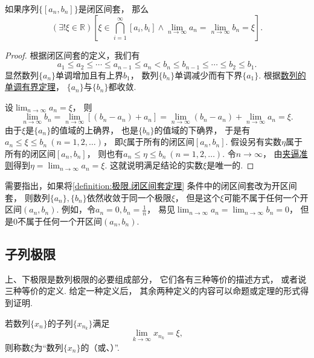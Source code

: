 \begin{theorem}[闭区间套定理]\label{definition:极限.闭区间套定理}
如果序列\(\{[a_n,b_n]\}\)是闭区间套，
那么\[
	(\exists!\xi\in\mathbb{R})
	\left[
		\xi \in \bigcap_{i=1}^\infty [a_i,b_i]
		\land
		\lim_{n\to\infty} a_n = \lim_{n\to\infty} b_n = \xi
	\right].
\]
\begin{proof}
根据闭区间套的定义，我们有\[
	a_1 \leq a_2 \leq \dotsb \leq a_{n-1} \leq a_n
	< b_n \leq b_{n-1} \leq \dotsb \leq b_2 \leq b_1.
\]
显然数列\(\{a_n\}\)单调增加且有上界\(b_1\)，
数列\(\{b_n\}\)单调减少而有下界\(\{a_1\}\).
根据\hyperref[theorem:极限.数列的单调有界定理]{数列的单调有界定理}，
\(\{a_n\}\)与\(\{b_n\}\)都收敛.

设\(\lim_{n\to\infty} a_n = \xi\)，
则\[
	\lim_{n\to\infty} b_n
	= \lim_{n\to\infty} [(b_n - a_n) + a_n]
	= \lim_{n\to\infty} (b_n - a_n) + \lim_{n\to\infty} a_n
	= \xi.
\]
由于\(\xi\)是\(\{a_n\}\)的值域的上确界，
也是\(\{b_n\}\)的值域的下确界，
于是有\(a_n \leq \xi \leq b_n\ (n=1,2,\dotsc)\)，
即\(\xi\)属于所有的闭区间\([a_n,b_n]\).
假设另有实数\(\eta\)属于所有的闭区间\([a_n,b_n]\)，
则也有\(a_n \leq \eta \leq b_n\ (n=1,2,\dotsc)\).
令\(n\to\infty\)，
由\hyperref[theorem:数列极限.夹逼准则]{夹逼准则}得到\(\eta=\lim_{n\to\infty} a_n=\xi\).
这就说明满足结论的实数\(\xi\)是唯一的.
\end{proof}
\end{theorem}

需要指出，如果将\cref{definition:极限.闭区间套定理} 条件中的闭区间套改为开区间套，
则数列\(\{a_n\},\{b_n\}\)依然收敛于同一个极限\(\xi\)，
但是这个\(\xi\)可能不属于任何一个开区间\((a_n,b_n)\).
例如，令\(a_n = 0, b_n = \frac1n\)，
易见\(\lim_{n\to\infty} a_n = \lim_{n\to\infty} b_n = 0\)，
但是\(0\)不属于任何一个开区间\((a_n,b_n)\).

\subsection{子列极限}
上、下极限是数列极限的必要组成部分，
它们各有三种等价的描述方式，
或者说三种等价的定义.
给定一种定义后，
其余两种定义的内容可以命题或定理的形式得到证明.

\begin{definition}
若数列\(\{x_n\}\)的子列\(\{x_{n_k}\}\)满足\[
	\lim_{k\to\infty} x_{n_k} = \xi,
\]
则称数\(\xi\)为“数列\(\{x_n\}\)的（或、）”.
\end{definition}

